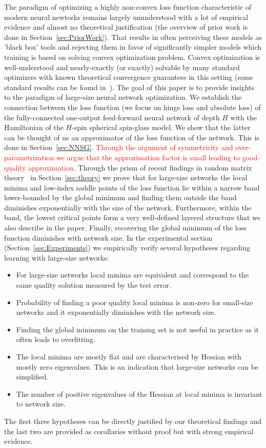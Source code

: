 \documentclass[twoside]{article}
\begin{document}
The paradigm of optimizing a highly non-convex loss function characteristic of modern neural newtorks remains largely ununderstood with a lot of empirical evidence and almost no theoretical justification (the overview of prior work is done in Section~\ref{sec:PriorWork}). That results in often perceiving these models as 'black box' tools and rejecting them in favor of significantly simpler models which training is based on solving convex optimization problem. Convex optimization is well-understood and nearly-exactly (or exactly) solvable by many standard optimizers with known theoretical convergence guarantees in this setting (some standard results can be found in~\cite{opac-b1104789, ben-tal_nemirovski:2001}). The goal of this paper is to provide insights to the paradigm of large-size neural network optimization. We establish the connection between the loss function (we focus on hinge loss and absolute loss) of the fully-connected one-output feed-forward neural network of depth $H$ with the Hamiltonian of the $H$-spin spherical spin-glass model. We show that the latter can be thought of us an approximator of the loss function of the network. This is done in Section~\ref{sec:NNSG}. \textcolor{red}{Through the argument of symmetricity and over-parametrization we argue that the approximation factor is small leading to good-quality approximation.} Through the prism of recent findings in random matrix theory~\cite{AAC2010} in Section~\ref{sec:theory} we prove that for large-size networks the local minima and low-index saddle points of the loss function lie within a narrow band lower-bounded by the global minimum and finding them outside the band diminishes exponentially with the size of the network. Furthermore, within the band, the lowest critical points form a very well-defined layered structure that we also describe in the paper. Finally, recovering the global minimum of the loss function diminishes with network size. In the experimental section (Section~\ref{sec:Experiments}) we empirically verify several hypotheses regarding learning with large-size networks:
\begin{itemize}
\item For large-size networks local minima are equivalent and correspond to the same quality solution measured by the test error.
\item Probability of finding a poor quality local minima is non-zero for small-size networks and it exponentially diminishes with the network size.
\item Finding the global minimum on the training set is not useful in practice as it often leads to overfitting.
\item The local minima are mostly flat and are characterised by Hessian with mostly zero eigenvalues. This is an indication that large-size networks can be simplified\cite{}.
\item The number of positive eigenvalues of the Hessian at local minima is invariant to network size.
\end{itemize}
The first three hypotheses can be directly justified by our theoretical findings and the last two are provided as corollaries without proof but with strong empirical evidence.
\end{document}
